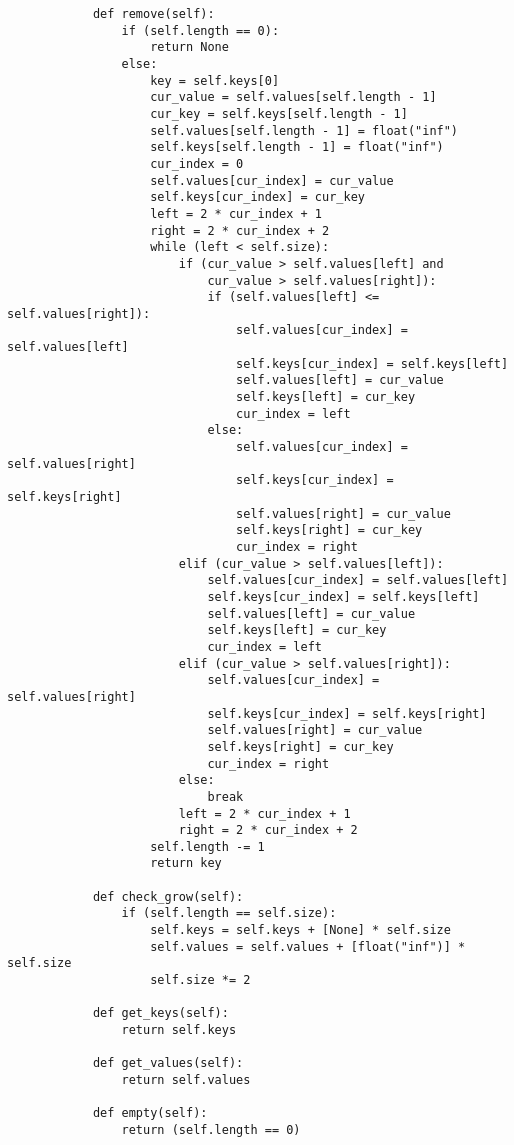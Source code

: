 \begin{lstlisting}
            def remove(self):
                if (self.length == 0):
                    return None
                else:
                    key = self.keys[0]
                    cur_value = self.values[self.length - 1]
                    cur_key = self.keys[self.length - 1]
                    self.values[self.length - 1] = float("inf")
                    self.keys[self.length - 1] = float("inf")
                    cur_index = 0
                    self.values[cur_index] = cur_value
                    self.keys[cur_index] = cur_key
                    left = 2 * cur_index + 1
                    right = 2 * cur_index + 2
                    while (left < self.size):
                        if (cur_value > self.values[left] and
                            cur_value > self.values[right]):
                            if (self.values[left] <= self.values[right]):
                                self.values[cur_index] = self.values[left]
                                self.keys[cur_index] = self.keys[left]
                                self.values[left] = cur_value
                                self.keys[left] = cur_key
                                cur_index = left
                            else:
                                self.values[cur_index] = self.values[right]
                                self.keys[cur_index] = self.keys[right]
                                self.values[right] = cur_value
                                self.keys[right] = cur_key
                                cur_index = right
                        elif (cur_value > self.values[left]):
                            self.values[cur_index] = self.values[left]
                            self.keys[cur_index] = self.keys[left]
                            self.values[left] = cur_value
                            self.keys[left] = cur_key
                            cur_index = left
                        elif (cur_value > self.values[right]):
                            self.values[cur_index] = self.values[right]
                            self.keys[cur_index] = self.keys[right]
                            self.values[right] = cur_value
                            self.keys[right] = cur_key
                            cur_index = right
                        else:
                            break
                        left = 2 * cur_index + 1
                        right = 2 * cur_index + 2
                    self.length -= 1
                    return key
            
            def check_grow(self):
                if (self.length == self.size):
                    self.keys = self.keys + [None] * self.size
                    self.values = self.values + [float("inf")] * self.size
                    self.size *= 2
                    
            def get_keys(self):
                return self.keys
            
            def get_values(self):
                return self.values

            def empty(self):
                return (self.length == 0)
    \end{lstlisting}

